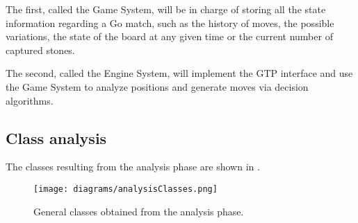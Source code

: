 The first, called the Game System, will be in charge of storing all the state
information regarding a Go match, such as the history of moves, the possible
variations, the state of the board at any given time or the current number of
captured stones.

The second, called the Engine System, will implement the GTP interface and use
the Game System to analyze positions and generate moves via decision algorithms.

\subsection{Class analysis}

The classes resulting from the analysis phase are shown in
.

\begin{figure}[h]
	\begin{center}
		\texttt{[image: diagrams/analysisClasses.png]}
		\caption{General classes obtained from the analysis
		phase.}\label{fig:analysisClasses}
	\end{center}
\end{figure}

